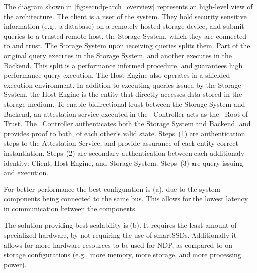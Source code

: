 The diagram shown in \autoref{fig:secndp-arch_overview} represents an high-level view of the \project{} architecture.
The client is a user of the \project{} system.
They hold security sensitive information (e.g., a database) on a remotely hosted storage device, and submit queries to a trusted remote host, the Storage System, which they are connected to and trust.
The Storage System upon receiving queries splits them. 
Part of the original query executes in the Storage System, and another executes in the \project{} Backend.
This split is a performance informed procedure, and guarantees high performance query execution.
The Host Engine also operates in a shielded execution environment. 
In addition to executing queries issued by the Storage System, the Host Engine is the entity that directly accesses data stored in the storage medium.
To enable bidirectional trust between the Storage System and Backend, an attestation service executed in the \project{}~Controller acts as the \project{}~Root-of-Trust.
The \project{}~Controller authenticates both the Storage System and Backend, and provides proof to both, of each other's valid state.
Steps~(1) are authentication steps to the \project{} Attestation Service, and provide assurance of each entity correct instantiation.
Steps~(2) are secondary authentication between each additionaly identity: Client, Host Engine, and Storage System.
Steps~(3) are query issuing and execution.
\fi




For better performance the best configuration is (a), due to the system components being connected to the same bus. This allows for the lowest latency in communication between the  components.

The solution providing best scalability is (b). 
It requires the least amount of specialized hardware, by not requiring the use of smartSSDs.
Additionally it allows for more hardware resources to be used for NDP, as compared to on-storage configurations (e.g., more memory, more storage, and more processing power).

